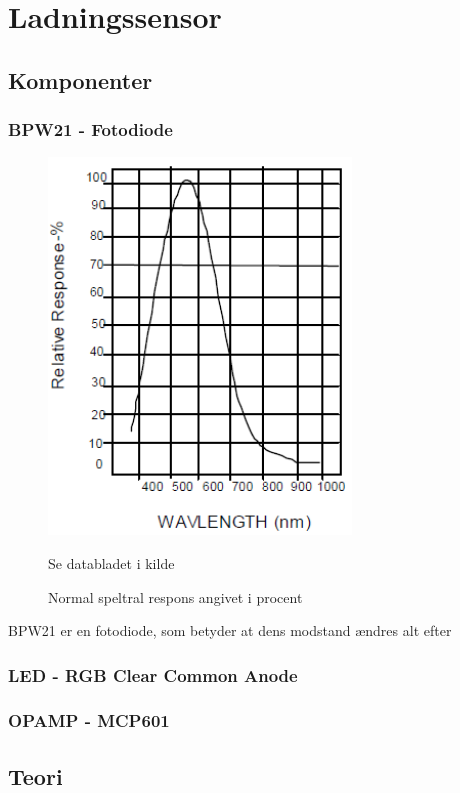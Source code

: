 \section{Ladningssensor}


\subsection{Komponenter}
\subsubsection{BPW21 - Fotodiode}
\begin{figure}[H]
	\centering
    \includegraphics[height=10cm]{figures/komponenter/photosensor}
	\caption{Normal speltral respons angivet i procent}
	Se databladet i kilde \cite{kompPhoto}
	\label{arduinoLCD}
\end{figure}
BPW21 er en fotodiode, som betyder at dens modstand ændres alt efter 

\subsubsection{LED - RGB Clear Common Anode}

\subsubsection{OPAMP - MCP601}

\subsection{Teori}
